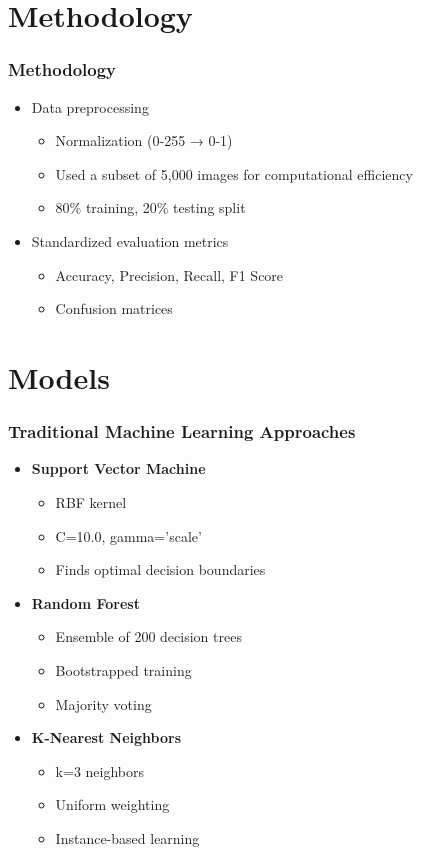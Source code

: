 \documentclass{beamer}
\begin{document}
\section{Methodology}

\begin{frame}
\frametitle{Methodology}

\begin{itemize}
    \item Data preprocessing
    \begin{itemize}
        \item Normalization (0-255 → 0-1)
        \item Used a subset of 5,000 images for computational efficiency
        \item 80\% training, 20\% testing split
    \end{itemize}
    \item Standardized evaluation metrics
    \begin{itemize}
        \item Accuracy, Precision, Recall, F1 Score
        \item Confusion matrices
    \end{itemize}
\end{itemize}

\end{frame}

\section{Models}

\begin{frame}
\frametitle{Traditional Machine Learning Approaches}

\begin{itemize}
\item \textbf{Support Vector Machine}
    \begin{itemize}
        \item RBF kernel
        \item C=10.0, gamma='scale'
        \item Finds optimal decision boundaries
    \end{itemize}
\item \textbf{Random Forest}
    \begin{itemize}
        \item Ensemble of 200 decision trees
        \item Bootstrapped training
        \item Majority voting
    \end{itemize}
\item \textbf{K-Nearest Neighbors}
    \begin{itemize}
        \item k=3 neighbors
        \item Uniform weighting
        \item Instance-based learning
    \end{itemize}
\end{itemize}

\end{frame}
\end{document}
